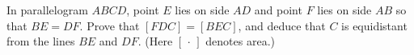 In parallelogram $ABCD$, point $E$ lies on side $AD$ and point $F$ lies on side $AB$ so that $BE=DF$. Prove that $[FDC]=[BEC]$, and deduce that $C$ is equidistant from the lines $BE$ and $DF$. (Here $[\,\cdot\,]$ denotes area.)

